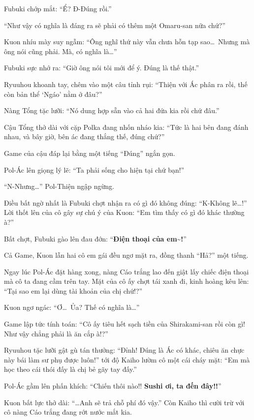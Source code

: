 \documentclass[../main.tex]{subfiles}
\begin{document}
Fubuki chớp mắt: ``Ể? Đ-Đúng rồi.''

``Như vậy có nghĩa là đáng ra sẽ phải có thêm một Omaru-san nữa chứ?''

Kuon nhíu mày suy ngẫm: ``Ông nghĩ thứ này vẫn chưa hỗn tạp sao\dots\ Nhưng mà ông nói cũng phải. Mà, có nghĩa là\dots''

Fubuki sực nhớ ra: ``Giờ ông nói tôi mới để ý. Đúng là thế thật.''

Ryuuhou khoanh tay, chêm vào một câu tỉnh rụi: ``Thiện với Ác phân ra rồi, thế còn bản thể `Ngáo' nằm ở đâu?''

Nàng Tổng tặc lưỡi: ``Nó dung hợp sẵn vào cả hai đứa kia rồi chứ đâu.''

Cậu Tổng thở dài với cặp Polka đang nhốn nháo kia: ``Tức là hai bên đang đánh nhau, và bây giờ, bên ác đang thắng thế, đúng chứ?''

Game của cậu đáp lại bằng một tiếng ``Đúng'' ngắn gọn.

Pol-Ác lên giọng lý lẽ: ``Ta phải sống cho hiện tại chứ bạn!''

``N-Nhưng\dots'' Pol-Thiện ngập ngừng.

Điều bất ngờ nhất là Fubuki chợt nhận ra có gì đó không đúng: ``K-Không lẽ\dots!'' Lời thốt lên của cô gây sự chú ý của Kuon: ``Em tìm thấy có gì đó khác thường à?''

Bất chợt, Fubuki gào lên đau đớn: ``\textbf{Điện thoại của em\~{}!}''

Cả Game, Kuon lẫn hai cô em gái đều ngơ mặt ra, đồng thanh ``Hả?'' một tiếng.

Ngay lúc Pol-Ác đặt hàng xong, nàng Cáo trắng lao đến giật lấy chiếc điện thoại mà cô ta đang cầm trên tay. Mặt của cô ấy chợt tái xanh đi, kinh hoàng kêu lên: ``Tại sao em lại dùng tài khoản của chị chứ!?''

Kuon ngơ ngác: ``Ơ\dots\ Ủa? Thế có nghĩa là\dots''

Game lập tức tính toán: ``Cô ấy tiêu hết sạch tiền của Shirakami-san rồi còn gì! Như vậy chẳng phải là ăn cắp à!?''

Ryuuhou tặc lưỡi gật gù tán thưởng: ``Đỉnh! Đúng là Ác có khác, chiêu ăn chực này bái làm sư phụ được luôn!'' tới độ Kaiho lườm cô một cái cháy mặt: ``Em mà học theo cái thói đấy là chị bẻ gãy tay đấy.''

Pol-Ác gầm lên phấn khích: ``Chiến thôi nào!! \textbf{Sushi ơi, ta đến đây!!}''

Kuon bất lực thở dài: ``\dots Anh sẽ trả chỗ phí đó vậy.'' Còn Kaiho thì cười trừ với cô nàng Cáo trắng đang rớt nước mắt kia.
\end{document}
